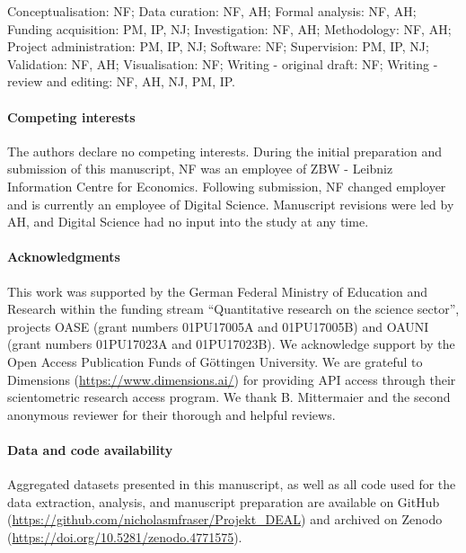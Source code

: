 \documentclass[
]{article}
\begin{document}
Conceptualisation: NF; Data curation: NF, AH; Formal analysis: NF, AH; Funding acquisition: PM, IP, NJ; Investigation: NF, AH; Methodology: NF, AH; Project administration: PM, IP, NJ; Software: NF; Supervision: PM, IP, NJ; Validation: NF, AH; Visualisation: NF; Writing - original draft: NF; Writing - review and editing: NF, AH, NJ, PM, IP.

\hypertarget{competing-interests}{%
\paragraph*{Competing interests}\label{competing-interests}}

The authors declare no competing interests. During the initial preparation and submission of this manuscript, NF was an employee of ZBW - Leibniz Information Centre for Economics. Following submission, NF changed employer and is currently an employee of Digital Science. Manuscript revisions were led by AH, and Digital Science had no input into the study at any time.

\hypertarget{acknowledgments}{%
\paragraph*{Acknowledgments}\label{acknowledgments}}

This work was supported by the German Federal Ministry of Education and Research within the
funding stream ``Quantitative research on the science sector'', projects OASE (grant numbers 01PU17005A and 01PU17005B) and OAUNI (grant numbers 01PU17023A and 01PU17023B). We acknowledge support by the Open Access Publication Funds of Göttingen University. We are grateful to Dimensions (\url{https://www.dimensions.ai/}) for providing API access through their scientometric research access program. We thank B. Mittermaier and the second anonymous reviewer for their thorough and helpful reviews.

\hypertarget{data-and-code-availability}{%
\paragraph*{Data and code availability}\label{data-and-code-availability}}

Aggregated datasets presented in this manuscript, as well as all code used for the data extraction, analysis, and manuscript preparation are available on GitHub (\url{https://github.com/nicholasmfraser/Projekt_DEAL}) and archived on Zenodo (\url{https://doi.org/10.5281/zenodo.4771575}).
\end{document}
